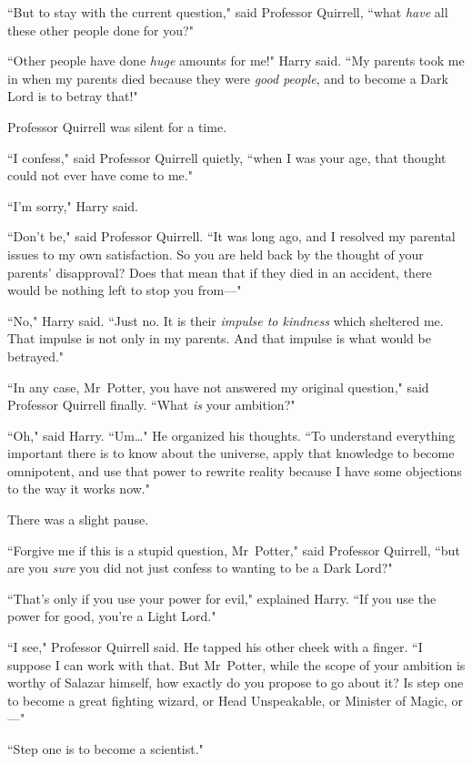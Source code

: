 ``But to stay with the current question," said Professor Quirrell, ``what \emph{have} all these other people done for you?"

``Other people have done \emph{huge} amounts for me!" Harry said. ``My parents took me in when my parents died because they were \emph{good people}, and to become a Dark Lord is to betray that!"

Professor Quirrell was silent for a time.

``I confess," said Professor Quirrell quietly, ``when I was your age, that thought could not ever have come to me."

``I'm sorry," Harry said.

``Don't be," said Professor Quirrell. ``It was long ago, and I resolved my parental issues to my own satisfaction. So you are held back by the thought of your parents' disapproval? Does that mean that if they died in an accident, there would be nothing left to stop you from—"

``No," Harry said. ``Just no. It is their \emph{impulse to kindness} which sheltered me. That impulse is not only in my parents. And that impulse is what would be betrayed."

``In any case, Mr~Potter, you have not answered my original question," said Professor Quirrell finally. ``What \emph{is} your ambition?"

``Oh," said Harry. ``Um{\ldots}" He organized his thoughts. ``To understand everything important there is to know about the universe, apply that knowledge to become omnipotent, and use that power to rewrite reality because I have some objections to the way it works now."

There was a slight pause.

``Forgive me if this is a stupid question, Mr~Potter," said Professor Quirrell, ``but are you \emph{sure} you did not just confess to wanting to be a Dark Lord?"

``That's only if you use your power for evil," explained Harry. ``If you use the power for good, you're a Light Lord."

``I see," Professor Quirrell said. He tapped his other cheek with a finger. ``I suppose I can work with that. But Mr~Potter, while the scope of your ambition is worthy of Salazar himself, how exactly do you propose to go about it? Is step one to become a great fighting wizard, or Head Unspeakable, or Minister of Magic, or—"

``Step one is to become a scientist."

